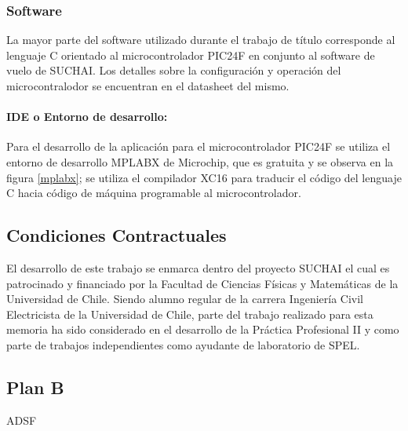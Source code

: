 \documentclass[11pt,letterpaper]{article}
\begin{document}
\subsubsection{Software}
La mayor parte del software utilizado durante el trabajo de título corresponde al lenguaje C orientado al microcontrolador PIC24F en conjunto al software de vuelo de SUCHAI. Los detalles sobre la configuración y operación del microcontralodor se encuentran en el datasheet del mismo.

\paragraph{IDE o Entorno de desarrollo:}
Para el desarrollo de la aplicación para el microcontrolador PIC24F se utiliza el entorno de desarrollo MPLABX de Microchip, que es gratuita y se observa en la figura \ref{mplabx}; se utiliza el compilador XC16 para traducir el código del lenguaje C hacia código de máquina programable al microcontrolador.

\subsection{Condiciones Contractuales} 
El desarrollo de este trabajo se enmarca dentro del proyecto SUCHAI el cual es patrocinado y financiado por la Facultad de Ciencias Físicas y Matemáticas de la Universidad de Chile. Siendo alumno regular de la carrera Ingeniería Civil Electricista de la Universidad de Chile, parte del trabajo realizado para esta memoria ha sido considerado en el desarrollo de la Práctica Profesional II y como parte de trabajos independientes como ayudante de laboratorio de SPEL.

\subsection{Plan B}
ADSF
\end{document}
